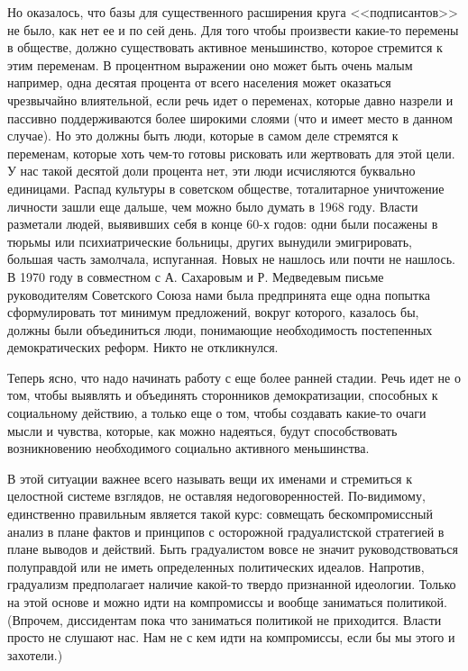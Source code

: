 \documentclass{book}
\begin{document}
Но оказалось, что базы для существенного расширения круга <<подписантов>> не было, как нет ее и по сей день. Для того чтобы 
произвести какие-то перемены в обществе, должно существовать активное меньшинство, которое стремится к этим переменам. В 
процентном выражении оно может быть очень малым например, одна десятая процента от всего населения может оказаться чрезвычайно 
влиятельной, если речь идет о переменах, которые давно назрели и пассивно поддерживаются более широкими слоями (что и имеет 
место в данном случае). Но это должны быть люди, которые в самом деле стремятся к переменам, которые хоть чем-то готовы 
рисковать или жертвовать для этой цели. У нас такой десятой доли процента нет, эти люди исчисляются буквально единицами. Распад 
культуры в советском обществе, тоталитарное уничтожение лично­сти зашли еще дальше, чем можно было думать в 1968 году. Власти 
разметали людей, выявивших себя в конце 60-х годов: одни были посажены в тюрьмы или психиатрические больницы, других вынудили 
эмигрировать, большая часть 
замолчала, испуганная. Новых не нашлось или почти не нашлось. В 1970 году в совместном с А. Сахаровым и Р. Медведевым письме 
руководителям Советского Союза нами была предпринята еще одна попытка сформулировать тот минимум предложений, вокруг которого, 
казалось бы, должны были объединиться люди, понимающие необходимость постепенных демократических реформ. Никто не откликнулся.

Теперь ясно, что надо начинать работу с еще более ранней стадии. Речь идет не о том, чтобы выявлять и объединять сторонников 
демократизации, способных к социальному действию, а только еще о том, чтобы создавать какие-то очаги мысли и чувства, которые, 
как можно надеяться, будут способствовать возникновению необходимого социально активного меньшинства.

В этой ситуации важнее всего называть вещи их именами и стремиться к целостной системе взглядов, не оставляя недоговоренностей. 
По-видимому, единственно правильным является такой курс: совмещать бескомпромиссный анализ в плане фактов и принципов с 
осторожной градуалистской стратегией в плане выводов и действий. Быть градуалистом вовсе не значит руководствоваться полуправдой 
или не иметь определенных политических идеалов. Напротив, градуализм предполагает наличие какой-то твердо признанной идеологии. 
Только на этой основе и можно идти на компромиссы и вообще заниматься политикой. (Впрочем, диссидентам пока что заниматься 
политикой не приходится. Власти просто не слушают нас. Нам не с кем идти на компромиссы, если бы мы этого и захотели.)
\end{document}
